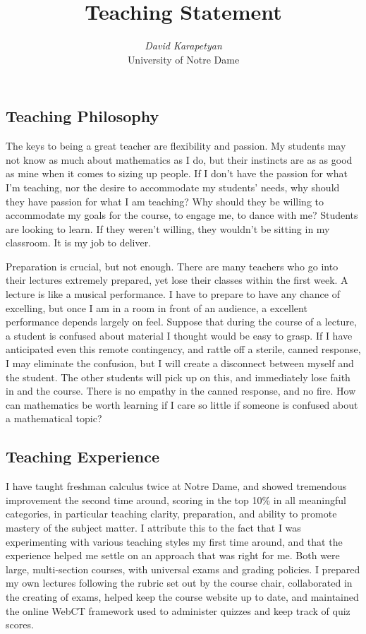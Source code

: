 \documentclass[12pt,oneside]{amsart}
\begin{document}
\title{Teaching Statement}
\author{{\it David Karapetyan}\\
University of Notre Dame}
\date{}
\maketitle
\thispagestyle{empty} %
\pagestyle{empty} %
\subsection{Teaching Philosophy} The keys to being a great teacher are
flexibility and passion. My students may not know as much about mathematics as
I do, but their instincts are as as good as mine when it comes to sizing up
people. If I don't have the passion for what I'm teaching, nor the desire
to accommodate my students' needs, why should they have passion for what I
am teaching? Why should they be willing to accommodate my goals for the
course, to engage me, to dance with me? Students are looking to learn. If they
weren't willing, they wouldn't be sitting in my classroom. It is my job to
deliver.

Preparation is crucial, but not enough. There are many teachers who go into
their lectures extremely prepared, yet lose their classes within the first week.
A lecture is like a musical performance. I have to prepare to have any chance
of excelling, but once I am in a room in front of an audience, a excellent
performance depends largely on feel. Suppose that during the course of a
lecture, a student is confused about material I thought would be easy to
grasp. If I have anticipated even this remote contingency, and rattle off a
sterile, canned response, I may eliminate the confusion, but I will create a
disconnect between myself and the student. The other students will pick up on
this, and immediately lose faith in  and the course. There is no empathy in
the canned response, and no fire. How can mathematics be worth learning if I
care so little if someone is confused about a mathematical topic?   

\subsection{Teaching Experience} I have taught freshman calculus twice at Notre
Dame, and showed tremendous improvement the second time around, scoring in the
top 10\% in all meaningful categories, in particular teaching clarity,
preparation, and ability to promote mastery of the subject matter. I attribute
this to the fact that I was experimenting with various
teaching styles my first time around, and that the experience helped me settle
on an approach that was right for me. Both were large, multi-section courses,
with universal exams and grading policies. I prepared my own lectures following
the rubric set out by the course chair, collaborated in the creating of exams,
helped keep the course website up to date, and maintained the online WebCT
framework used to administer quizzes and keep track of quiz scores.
\end{document}
